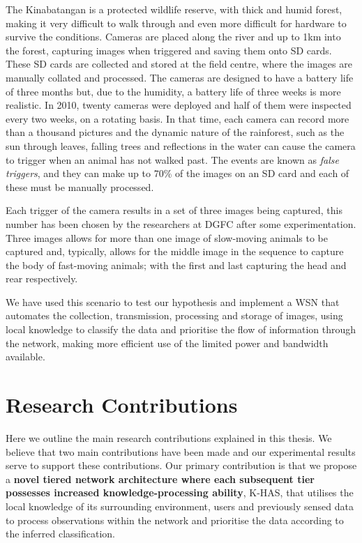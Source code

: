 The Kinabatangan is a protected wildlife reserve, with thick and humid forest, making it very difficult to walk through and even more difficult for hardware to survive the conditions. Cameras are placed along the river and up to 1km into the forest, capturing images when triggered and saving them onto SD cards. These SD cards are collected and stored at the field centre, where the images are manually collated and processed. The cameras are designed to have a battery life of three months but, due to the humidity, a battery life of three weeks is more realistic. In 2010, twenty cameras were deployed and half of them were inspected every two weeks, on a rotating basis. In that time, each camera can record more than a thousand pictures and the dynamic nature of the rainforest, such as the sun through leaves, falling trees and reflections in the water can cause the camera to trigger when an animal has not walked past. The events are known as \textit{false triggers}, and they can make up to 70\% of the images on an SD card and each of these must be manually processed. 

Each trigger of the camera results in a set of three images being captured, this number has been chosen by the researchers at DGFC after some experimentation. Three images allows for more than one image of slow-moving animals to be captured and, typically, allows for the middle image in the sequence to capture the body of fast-moving animals; with the first and last capturing the head and rear respectively.

We have used this scenario to test our hypothesis and implement a WSN that automates the collection, transmission, processing and storage of images, using local knowledge to classify the data and prioritise the flow of information through the network, making more efficient use of the limited power and bandwidth available. 

\section{Research Contributions}

Here we outline the main research contributions explained in this thesis. We believe that two main contributions have been made and our experimental results serve to support these contributions.
Our primary contribution is that we propose a \textbf{novel tiered network architecture where each subsequent tier possesses increased knowledge-processing ability}, K-HAS, that utilises the local knowledge of its surrounding environment, users and previously sensed data to process observations within the network and prioritise the data according to the inferred classification. 

